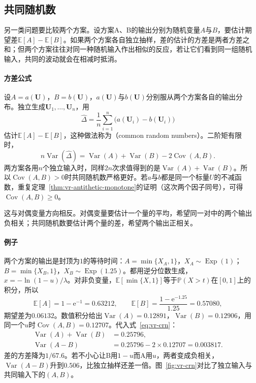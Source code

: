 \subsection{共同随机数}
\label{sec:vr-crn}

另一类问题要比较两个方案。设方案A、B的输出分别为随机变量$A$与$B$，要估计期望差$\mathbb{E}[A]-\mathbb{E}[B]$。如果两个方案各自独立抽样，差的估计的方差是两者方差之和；但两个方案往往对同一种随机输入作出相似的反应，若让它们看到同一组随机输入，共同的波动就会在相减时抵消。

\paragraph{方差公式}
设$A=a(\bm{U})$，$B=b(\bm{U})$，$a(\bm{U})$与$b(\bm{U})$分别服从两个方案各自的输出分布。独立生成$\bm{U}_1,\dots,\bm{U}_n$，用
\[
 \hat{\Delta}=\frac1n\sum_{i=1}^{n}\bigl(a(\bm{U}_i)-b(\bm{U}_i)\bigr)
\]
估计$\mathbb{E}[A]-\mathbb{E}[B]$，这种做法称为（common random numbers）。二阶矩有限时，
\begin{equation}
 n\operatorname{Var}(\hat{\Delta})=\operatorname{Var}(A)+\operatorname{Var}(B)-2\operatorname{Cov}(A,B) .
 \label{eq:vr-crn}
\end{equation}
两方案各用$n$个独立输入时，同样$2n$次求值得到的是$\operatorname{Var}(A)+\operatorname{Var}(B)$。所以$\operatorname{Cov}(A,B)>0$时共同随机数严格更好。若$a$与$b$都是同一个标量$U$的不减函数，重复定理~\ref{thm:vr-antithetic-monotone}的证明（这次两个因子同号），可得$\operatorname{Cov}(A,B)\geq0$。

这与对偶变量方向相反。对偶变量要估计一个量的平均，希望同一对中的两个输出负相关；共同随机数要估计两个量的差，希望两个输出正相关。

\paragraph{例子}
两个方案的输出是封顶为$1$的等待时间：$A=\min\{X_A,1\}$，$X_A\sim\operatorname{Exp}(1)$；$B=\min\{X_B,1\}$，$X_B\sim\operatorname{Exp}(1.25)$。都用逆分位数生成，$x=-\ln(1-u)/\lambda$。对非负变量，$\mathbb{E}[\min\{X,1\}]$等于$\mathbb{P}(X>t)$在$[0,1]$上的积分，所以
\[
 \mathbb{E}[A]=1-\mathrm{e}^{-1}=0.63212,\qquad \mathbb{E}[B]=\frac{1-\mathrm{e}^{-1.25}}{1.25}=0.57080 ,
\]
期望差为$0.06132$。数值积分给出$\operatorname{Var}(A)=0.12891$，$\operatorname{Var}(B)=0.12906$，用同一个$u$时$\operatorname{Cov}(A,B)=0.12707$。代入式~\eqref{eq:vr-crn}：
\[
 \begin{aligned}
 \operatorname{Var}(A)+\operatorname{Var}(B)&=0.25796,\\
 \operatorname{Var}(A-B)&=0.25796-2\times0.12707=0.003817 .
 \end{aligned}
\]
差的方差降为$1/67.6$。若不小心让B用$1-u$而A用$u$，两者变成负相关，$\operatorname{Var}(A-B)$升到$0.506$，比独立抽样还差一倍。图~\ref{fig:vr-crn}对比了独立输入与共同输入下的$(A,B)$。

